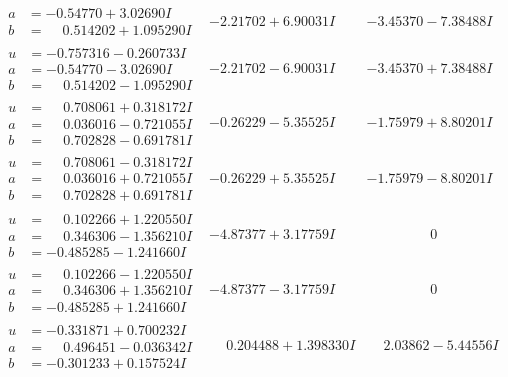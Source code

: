 \documentclass[1p]{elsarticle_modified}
\theoremstyle{definition}
\begin{document}
$$\begin{array}{c|c|c}
\begin{aligned}
a &= -0.54770 + 3.02690 I \\
b &= \phantom{-}0.514202 + 1.095290 I\end{aligned}
 & -2.21702 + 6.90031 I & -3.45370 - 7.38488 I \\ \hline\begin{aligned}
u &= -0.757316 - 0.260733 I \\
a &= -0.54770 - 3.02690 I \\
b &= \phantom{-}0.514202 - 1.095290 I\end{aligned}
 & -2.21702 - 6.90031 I & -3.45370 + 7.38488 I \\ \hline\begin{aligned}
u &= \phantom{-}0.708061 + 0.318172 I \\
a &= \phantom{-}0.036016 - 0.721055 I \\
b &= \phantom{-}0.702828 - 0.691781 I\end{aligned}
 & -0.26229 - 5.35525 I & -1.75979 + 8.80201 I \\ \hline\begin{aligned}
u &= \phantom{-}0.708061 - 0.318172 I \\
a &= \phantom{-}0.036016 + 0.721055 I \\
b &= \phantom{-}0.702828 + 0.691781 I\end{aligned}
 & -0.26229 + 5.35525 I & -1.75979 - 8.80201 I \\ \hline\begin{aligned}
u &= \phantom{-}0.102266 + 1.220550 I \\
a &= \phantom{-}0.346306 - 1.356210 I \\
b &= -0.485285 - 1.241660 I\end{aligned}
 & -4.87377 + 3.17759 I & \phantom{-0.000000 } 0 \\ \hline\begin{aligned}
u &= \phantom{-}0.102266 - 1.220550 I \\
a &= \phantom{-}0.346306 + 1.356210 I \\
b &= -0.485285 + 1.241660 I\end{aligned}
 & -4.87377 - 3.17759 I & \phantom{-0.000000 } 0 \\ \hline\begin{aligned}
u &= -0.331871 + 0.700232 I \\
a &= \phantom{-}0.496451 - 0.036342 I \\
b &= -0.301233 + 0.157524 I\end{aligned}
 & \phantom{-}0.204488 + 1.398330 I & \phantom{-}2.03862 - 5.44556 I \\ \hline\begin{aligned}

\end{aligned}
\end{array}$$
\end{document}
